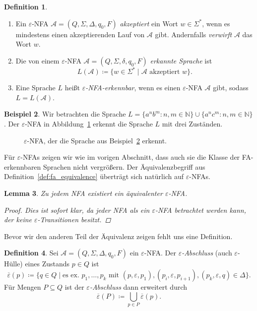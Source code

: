 \documentclass[11pt, a4paper]{article}
\theoremstyle{definition}
\newtheorem{definition}{Definition}[section]
\newtheorem{example}[definition]{Beispiel}
\theoremstyle{plain}
\newtheorem{lemma}[definition]{Lemma}
\numberwithin{equation}{section}
\newcommand{\comp}[1]{\overline{#1}}
\begin{document}
\begin{definition}
\
	\begin{enumerate}
		\item Ein \(\varepsilon\)-NFA \( \mathcal{A} = (Q, \Sigma, \Delta, q_0, F) \) \textit{akzeptiert} ein Wort \( w \in \Sigma^\ast \), wenn es mindestens einen akzeptierenden Lauf von \( \mathcal{A} \) gibt. Andernfalls \textit{verwirft} \( \mathcal{A} \) das Wort \( w \).
		\item Die von einem \(\varepsilon\)-NFA \( \mathcal{A} = (Q, \Sigma, \delta, q_0, F) \) \textit{erkannte Sprache} ist
			\[
				L(\mathcal{A}) \coloneqq \{ w \in \Sigma^\ast \mid \mathcal{A} \text{ akzeptiert } w \}.
			\]
		\item Eine Sprache \( L \) heißt \textit{\(\varepsilon\)-NFA-erkennbar}, wenn es einen \(\varepsilon\)-NFA \( \mathcal{A} \) gibt, sodass \( L = L(\mathcal{A}) \).
	\end{enumerate}
\end{definition}
\begin{example}\label{exp:ex3}
	Wir betrachten die Sprache \( L = \{ a^n b^m : n, m \in \mathbb{N} \} \cup \{ a^n c^m : n, m \in \mathbb{N} \} \). Der \(\varepsilon\)-NFA in Abbildung~\ref{fig:epsnfa_ex1} erkennt die Sprache \( L \) mit drei Zuständen.
\end{example}
\begin{figure}
	\centering
	
	\caption{\(\varepsilon\)-NFA, der die Sprache aus Beispiel~\ref{exp:ex3} erkennt.}
	\label{fig:epsnfa_ex1}
\end{figure}
Für \(\varepsilon\)-NFAs zeigen wir wie im vorigen Abschnitt, dass auch sie die Klasse der FA-erkennbaren Sprachen nicht vergrößern. Der Äquivalenzbegriff aus Definition~\ref{def:fa_equivalence} überträgt sich natürlich auf \(\varepsilon\)-NFAs.
\begin{lemma}
	Zu jedem NFA existiert ein äquivalenter \(\varepsilon\)-NFA.
	\begin{proof}
		Dies ist sofort klar, da jeder NFA als ein \(\varepsilon\)-NFA betrachtet werden kann, der keine \(\varepsilon\)-Transitionen besitzt.
	\end{proof}
\end{lemma}
Bevor wir den anderen Teil der Äquivalenz zeigen fehlt uns eine Definition.
\begin{definition}\label{def:eps_closure}
	Sei \( \mathcal{A} = (Q, \Sigma, \Delta, q_0, F) \) ein \(\varepsilon\)-NFA. Der \textit{\(\varepsilon\)-Abschluss} (auch \(\varepsilon\)-Hülle) eines Zustands \( p \in Q \) ist
	\[
		\comp{\varepsilon}(p) \coloneqq \{ q \in Q \mid \text{es ex. } p_1, \ldots, p_k \text{ mit } (p, \varepsilon, p_1), (p_i, \varepsilon, p_{i+1}), (p_k, \varepsilon, q) \in \Delta \}.
	\]
	Für Mengen \( P \subseteq Q \) ist der \textit{\(\varepsilon\)-Abschluss} dann erweitert durch
	\[
		\comp{\varepsilon}(P) \coloneqq \bigcup_{p \in P} \comp{\varepsilon}(p).
	\]
\end{definition}
\end{document}
